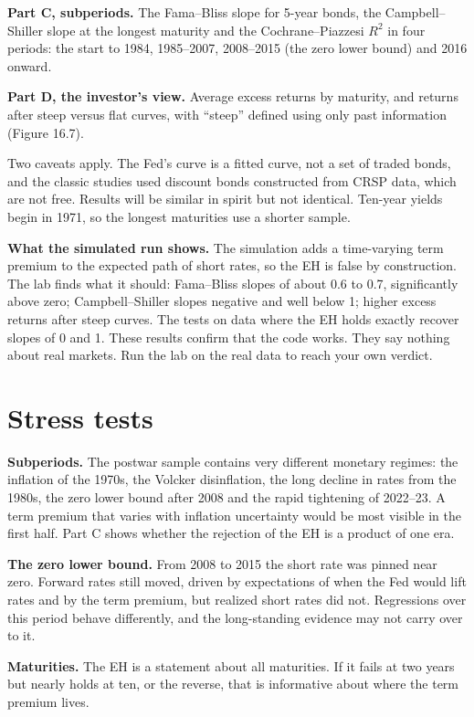 \textbf{Part C, subperiods.} The Fama--Bliss slope for 5-year bonds, the Campbell--Shiller slope at the longest maturity and the Cochrane--Piazzesi $R^2$ in four periods: the start to 1984, 1985--2007, 2008--2015 (the zero lower bound) and 2016 onward.

\textbf{Part D, the investor's view.} Average excess returns by maturity, and returns after steep versus flat curves, with ``steep'' defined using only past information (Figure 16.7).

Two caveats apply. The Fed's curve is a fitted curve, not a set of traded bonds, and the classic studies used discount bonds constructed from CRSP data, which are not free. Results will be similar in spirit but not identical. Ten-year yields begin in 1971, so the longest maturities use a shorter sample.

\textbf{What the simulated run shows.} The simulation adds a time-varying term premium to the expected path of short rates, so the EH is false by construction. The lab finds what it should: Fama--Bliss slopes of about 0.6 to 0.7, significantly above zero; Campbell--Shiller slopes negative and well below 1; higher excess returns after steep curves. The tests on data where the EH holds exactly recover slopes of 0 and 1. These results confirm that the code works. They say nothing about real markets. Run the lab on the real data to reach your own verdict.

\section{Stress tests}
\label{sec:16-stress}

\textbf{Subperiods.} The postwar sample contains very different monetary regimes: the inflation of the 1970s, the Volcker disinflation, the long decline in rates from the 1980s, the zero lower bound after 2008 and the rapid tightening of 2022--23. A term premium that varies with inflation uncertainty would be most visible in the first half. Part C shows whether the rejection of the EH is a product of one era.

\textbf{The zero lower bound.} From 2008 to 2015 the short rate was pinned near zero. Forward rates still moved, driven by expectations of when the Fed would lift rates and by the term premium, but realized short rates did not. Regressions over this period behave differently, and the long-standing evidence may not carry over to it.

\textbf{Maturities.} The EH is a statement about all maturities. If it fails at two years but nearly holds at ten, or the reverse, that is informative about where the term premium lives.

